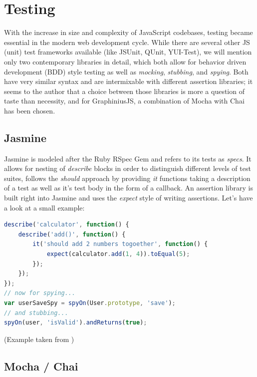 	
\section{Testing}
\label{sect:testing}

	With the increase in size and complexity of JavaScript codebases, testing became essential in the modern web development cycle. While there are several other JS (unit) test frameworks available (like JSUnit, QUnit, YUI-Test), we will mention only two contemporary libraries in detail, which both allow for behavior driven development (BDD) style testing as well as \textit{mocking}, \textit{stubbing}, and \textit{spying}. Both have very similar syntax and are intermixable with different assertion libraries; it seems to the author that a choice between those libraries is more a question of taste than necessity, and for GraphiniusJS, a combination of Mocha with Chai has been chosen.

	\subsection{Jasmine}
	\label{ssect:jasmine}
	
	Jasmine \citep{hahn2013javascript} is modeled after the Ruby RSpec Gem and refers to its tests as \textit{specs}. It allows for nesting of \textit{describe} blocks in order to distinguish different levels of test suites, follows the \textit{should} approach by providing \textit{it} functions taking a description of a test as well as it's test body in the form of a callback. An assertion library is built right into Jasmine and uses the \textit{expect} style of writing assertions. Let's have a look at a small example:
	
	\begin{lstlisting}[caption={Jasmine example of a nested test suite containing one simple assertion in expect style as well as a spy and a stub}, label={lst:jasmine_expect}, language=JavaScript]
describe('calculator', function() {
	describe('add()', function() {
		it('should add 2 numbers togoether', function() {
			expect(calculator.add(1, 4)).toEqual(5);
		});
	});
});
// now for spying...
var userSaveSpy = spyOn(User.prototype, 'save');
// and stubbing...
spyOn(user, 'isValid').andReturns(true);
	\end{lstlisting}
	\small
	(Example taken from \citep{JSTestTest})
	
	
	\subsection{Mocha / Chai}
	\label{ssect:mocha_chai}
	
